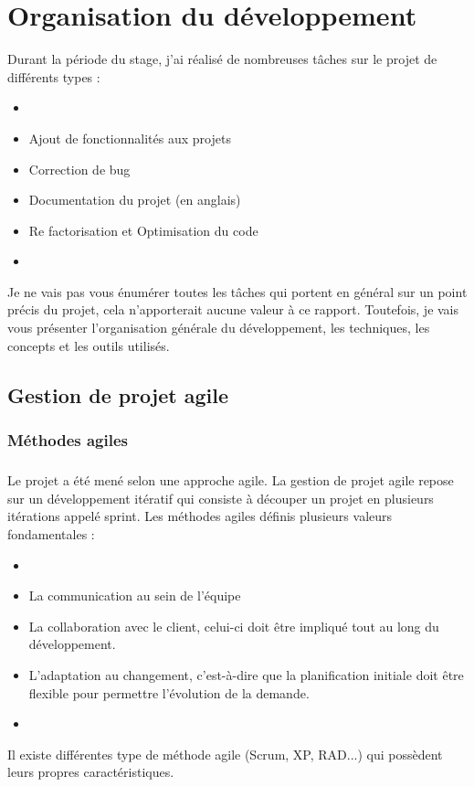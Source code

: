 \chapter{Organisation du développement}
Durant la période du stage, j'ai réalisé de nombreuses tâches sur le projet de différents types : 
\begin{itemize}
\item[]
\item Ajout de fonctionnalités aux projets
\item Correction de bug
\item Documentation du projet (en anglais)
\item Re factorisation et Optimisation du code
\item[]
\end{itemize}

Je ne vais pas vous énumérer toutes les tâches qui portent en général sur un point précis du projet,  cela n'apporterait aucune valeur à ce rapport. Toutefois, je vais vous présenter l'organisation générale du développement, les techniques, les concepts et les outils utilisés.

\section{Gestion de projet agile}
\subsection{Méthodes agiles}
\paragraph{}
Le projet a été mené selon une approche agile. La gestion de projet agile repose sur un développement itératif qui consiste à découper un projet en plusieurs itérations appelé sprint. Les méthodes agiles définis plusieurs valeurs fondamentales : 
\begin{itemize}
         \item[]
\item La communication au sein de l'équipe
\item La collaboration avec le client, celui-ci doit être impliqué tout au long du développement.
\item L'adaptation au changement, c'est-à-dire que la planification initiale doit être flexible pour permettre l'évolution de la demande. 
         \item[]
\end{itemize}
Il existe différentes type de méthode agile (Scrum, XP, RAD...) qui possèdent leurs propres caractéristiques.

